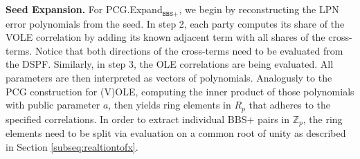 \\\\
\textbf{Seed Expansion.} For PCG.Expand$_{\texttt{BBS+}}$, we begin by reconstructing the LPN error polynomials from the seed. In step 2, each party computes its share of the VOLE correlation by adding its known adjacent term with all shares of the cross-terms. Notice that both directions of the cross-terms need to be evaluated from the DSPF. Similarly, in step 3, the OLE correlations are being evaluated. All parameters are then interpreted as vectors of polynomials. Analogusly to the PCG construction for (V)OLE, computing the inner product of those polynomials with public parameter $a$, then yields ring elements in $R_p$ that adheres to the specified correlations. In order to extract individual BBS+ pairs in $\mathbb{Z}_{p}$, the ring elements need to be split via evaluation on a common root of unity as described in Section \ref{subseq:realtiontofx}.

